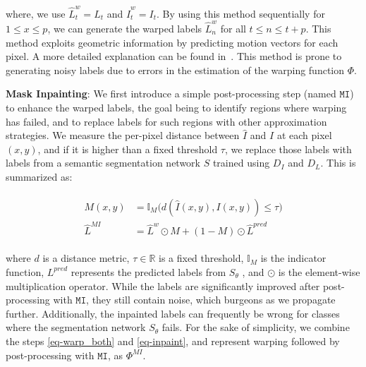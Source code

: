 where, we use $\hat{L}^{w}_t = L_t$ and $\hat{I}^{w}_t = I_t$. By using this method sequentially for $1 \leq x \leq p$, we can generate the warped labels $\hat{L}^{w}_{n}$ for all $t \leq n \leq t + p$.
This method exploits geometric information by predicting motion vectors for each pixel. A more detailed explanation can be found in~\cite{nvidia_cvpr19, sdc_net}. This method is prone to generating noisy labels due to errors in the estimation of the warping function $\Phi$. 

\textbf{Mask Inpainting}: We first introduce a simple post-processing step (named $\mathtt{MI}$) to enhance the warped labels, the goal being to identify regions where warping has failed, and to replace labels for such regions with other approximation strategies. 
We measure the per-pixel distance between $\hat{I}$ and $I$ at each pixel $(x,y)$, and if it is higher than a fixed threshold $\tau$, we replace those labels with labels from a semantic segmentation network $S$ trained using $D_I$ and $D_L$. 
This is summarized as:

\begin{align}
\begin{split}
\label{eq-inpaint}
M(x, y) & = \mathbb{I}_{M}\big(d(\hat{I}(x,y),I(x,y) ) \leq \tau \big) \\
\hat{L}^{MI} & = \hat{L}^{w} \odot M + (1-M) \odot \hat{L}^{pred}
\end{split}
\end{align}

where $d$ is a distance metric, $\tau \in \mathbb R$ is a fixed threshold, $\mathbb{I}_{M}$ is the indicator function, $L^{pred}$ represents the predicted labels from $S_\theta$ , and $\odot$ is the element-wise multiplication operator. While the labels are significantly improved after post-processing with $\mathtt{MI}$, they still contain noise, which burgeons as we propagate further. Additionally, the inpainted labels can frequently be wrong for classes where the segmentation network $S_\theta$ fails. 
For the sake of simplicity, we combine the steps \eqref{eq-warp_both} and \eqref{eq-inpaint}, and represent warping followed by post-processing with $\mathtt{MI}$, as $\Phi^{MI}$.

